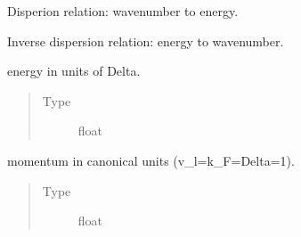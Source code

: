 \documentclass[letterpaper,10pt,english]{sphinxmanual}
\begin{document}
\begin{fulllineitems}
\begin{fulllineitems}
\begin{quote}
\begin{description}
\end{description}\end{quote}

\end{fulllineitems}


\begin{fulllineitems}
\label{\detokenize{code_structure:scdc.particle.Particle.dispersion}}
Disperion relation: wavenumber to energy.

\end{fulllineitems}


\begin{fulllineitems}
\label{\detokenize{code_structure:scdc.particle.Particle.dispersion_inverse}}
Inverse dispersion relation: energy to wavenumber.

\end{fulllineitems}


\begin{fulllineitems}
\label{\detokenize{code_structure:id1}}
energy in units of Delta.
\begin{quote}\begin{description}
\item[{Type}] \leavevmode
float

\end{description}\end{quote}

\end{fulllineitems}


\begin{fulllineitems}
\label{\detokenize{code_structure:scdc.particle.Particle.momentum}}
momentum in canonical units (v\_l=k\_F=Delta=1).
\begin{quote}\begin{description}
\item[{Type}] \leavevmode
float


\end{description}
\end{quote}
\end{fulllineitems}
\end{fulllineitems}
\end{document}
